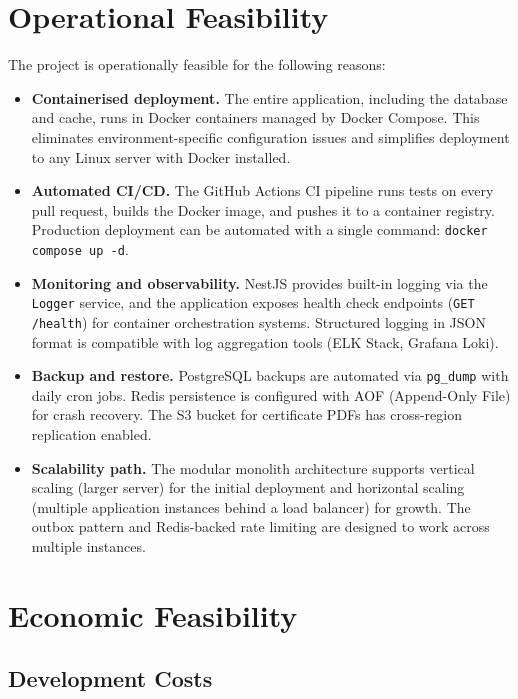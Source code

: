 \section{Operational Feasibility}
\label{sec:app-ops-feasibility}

The project is operationally feasible for the following reasons:

\begin{itemize}
  \item \textbf{Containerised deployment.} The entire application, including the database and cache, runs in Docker containers managed by Docker Compose. This eliminates environment-specific configuration issues and simplifies deployment to any Linux server with Docker installed.
  \item \textbf{Automated CI/CD.} The GitHub Actions CI pipeline runs tests on every pull request, builds the Docker image, and pushes it to a container registry. Production deployment can be automated with a single command: \texttt{docker compose up -d}.
  \item \textbf{Monitoring and observability.} NestJS provides built-in logging via the \texttt{Logger} service, and the application exposes health check endpoints (\texttt{GET /health}) for container orchestration systems. Structured logging in JSON format is compatible with log aggregation tools (ELK Stack, Grafana Loki).
  \item \textbf{Backup and restore.} PostgreSQL backups are automated via \texttt{pg\_dump} with daily cron jobs. Redis persistence is configured with AOF (Append-Only File) for crash recovery. The S3 bucket for certificate PDFs has cross-region replication enabled.
  \item \textbf{Scalability path.} The modular monolith architecture supports vertical scaling (larger server) for the initial deployment and horizontal scaling (multiple application instances behind a load balancer) for growth. The outbox pattern and Redis-backed rate limiting are designed to work across multiple instances.
\end{itemize}

\section{Economic Feasibility}
\label{sec:app-econ-feasibility}

\subsection{Development Costs}

